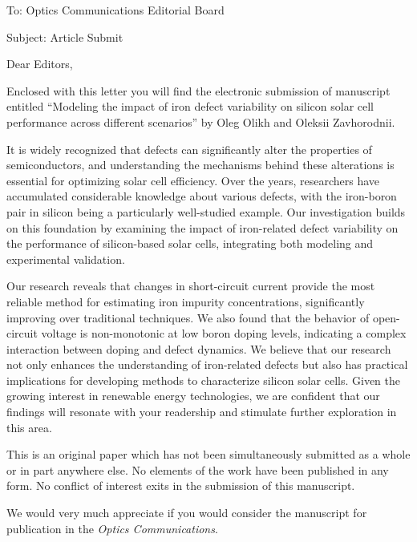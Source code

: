 \documentclass[preprint]{elsarticle}
\begin{document}
To:
Optics Communications Editorial Board


Subject:
Article Submit

\vspace{5mm}
Dear Editors,

\vspace{3mm}
Enclosed with this letter you will find the electronic submission of manuscript entitled
``Modeling the impact of iron defect variability on silicon solar cell performance across different scenarios''
by Oleg Olikh and Oleksii Zavhorodnii.

It is widely recognized that defects can significantly alter the properties of semiconductors,
and understanding the mechanisms behind these alterations is essential for optimizing solar cell efficiency.
Over the years, researchers have accumulated considerable knowledge about various defects,
with the iron-boron pair in silicon being a particularly well-studied example.
Our investigation builds on this foundation by examining the impact of iron-related defect variability
on the performance of silicon-based solar cells, integrating both modeling and experimental validation.

Our research reveals that changes in short-circuit current provide the most reliable method for estimating iron impurity concentrations,
significantly improving over traditional techniques.
We also found that the behavior of open-circuit voltage is non-monotonic at low boron doping levels,
indicating a complex interaction between doping and defect dynamics.
We believe that our research not only enhances the understanding of iron-related defects
but also has practical implications for developing methods to characterize silicon solar cells.
Given the growing interest in renewable energy technologies,
we are confident that our findings will resonate with your readership and stimulate further exploration in this area.


This is an original paper which has not been simultaneously submitted as a whole or in part anywhere else.
No elements of the work have been published in any form.
No conflict of interest exits in the submission of this manuscript.


We would  very much appreciate if you would consider the manuscript for publication in the \emph{Optics Communications}.
\end{document}

